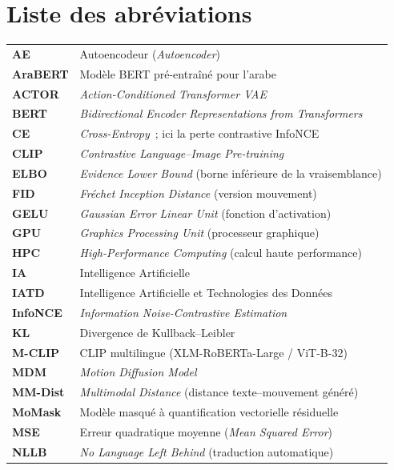\documentclass[12pt,a4paper,oneside]{report}
\theoremstyle{definition}
\theoremstyle{plain}
\renewcommand{\arraystretch}{1.15}
\begin{document}
\chapter*{Liste des abréviations}
\begingroup
\setlength{\tabcolsep}{12pt}
\renewcommand{\arraystretch}{1.25}
\noindent
\begin{longtable}{@{}p{2.4cm}p{12cm}@{}}
\textbf{AE} & Autoencodeur (\emph{Autoencoder}) \\
\textbf{AraBERT} & Modèle BERT pré-entraîné pour l'arabe \\
\textbf{ACTOR} & \emph{Action-Conditioned Transformer VAE} \\
\textbf{BERT} & \emph{Bidirectional Encoder Representations from Transformers} \\
\textbf{CE} & \emph{Cross-Entropy}~; ici la perte contrastive InfoNCE \\
\textbf{CLIP} & \emph{Contrastive Language--Image Pre-training} \\
\textbf{ELBO} & \emph{Evidence Lower Bound} (borne inférieure de la vraisemblance) \\
\textbf{FID} & \emph{Fréchet Inception Distance} (version mouvement) \\
\textbf{GELU} & \emph{Gaussian Error Linear Unit} (fonction d'activation) \\
\textbf{GPU} & \emph{Graphics Processing Unit} (processeur graphique) \\
\textbf{HPC} & \emph{High-Performance Computing} (calcul haute performance) \\
\textbf{IA} & Intelligence Artificielle \\
\textbf{IATD} & Intelligence Artificielle et Technologies des Données \\
\textbf{InfoNCE} & \emph{Information Noise-Contrastive Estimation} \\
\textbf{KL} & Divergence de Kullback--Leibler \\
\textbf{M-CLIP} & CLIP multilingue (XLM-RoBERTa-Large / ViT-B-32) \\
\textbf{MDM} & \emph{Motion Diffusion Model} \\
\textbf{MM-Dist} & \emph{Multimodal Distance} (distance texte--mouvement généré) \\
\textbf{MoMask} & Modèle masqué à quantification vectorielle résiduelle \\
\textbf{MSE} & Erreur quadratique moyenne (\emph{Mean Squared Error}) \\
\textbf{NLLB} & \emph{No Language Left Behind} (traduction automatique) \\

\end{longtable}
\end{document}
